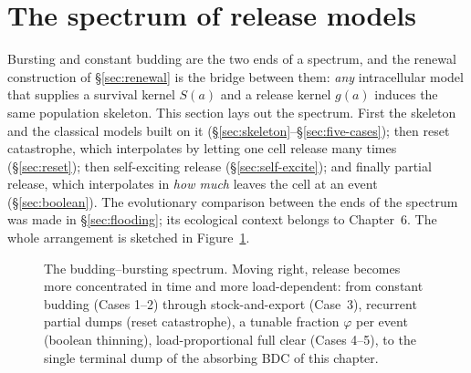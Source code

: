 
\section{The spectrum of release models}
\label{sec:spectrum}

Bursting and constant budding are the two ends of a spectrum, and the
renewal construction of \S\ref{sec:renewal} is the bridge between them:
\emph{any} intracellular model that supplies a survival kernel $S(a)$ and a
release kernel $g(a)$ induces the same population skeleton. This section
lays out the spectrum. First the skeleton and the classical models built on
it (\S\ref{sec:skeleton}--\S\ref{sec:five-cases}); then reset catastrophe,
which interpolates by letting one cell release many times
(\S\ref{sec:reset}); then self-exciting release (\S\ref{sec:self-excite});
and finally partial release, which interpolates in \emph{how much} leaves
the cell at an event (\S\ref{sec:boolean}). The evolutionary comparison
between the ends of the spectrum was made in \S\ref{sec:flooding}; its
ecological context belongs to Chapter~6. The whole arrangement is sketched
in Figure~\ref{fig:spectrum-map}.

\begin{figure}[H]
\centering
{}
\caption{The budding--bursting spectrum. Moving right, release becomes more
concentrated in time and more load-dependent: from constant budding (Cases
1--2) through stock-and-export (Case~3), recurrent partial dumps (reset
catastrophe), a tunable fraction $\varphi$ per event (boolean thinning),
load-proportional full clear (Cases 4--5), to the single terminal dump of
the absorbing BDC of this chapter.}
\label{fig:spectrum-map}
\end{figure}

